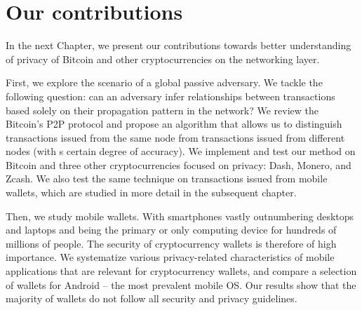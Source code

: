 \section{Our contributions}
\label{sec:C02S4OurContributions}

In the next Chapter, we present our contributions towards better understanding of privacy of Bitcoin and other cryptocurrencies on the networking layer.

First, we explore the scenario of a global passive adversary.
We tackle the following question: can an adversary infer relationships between transactions based solely on their propagation pattern in the network?
We review the Bitcoin's P2P protocol and propose an algorithm that allows us to distinguish transactions issued from the same node from transactions issued from different nodes (with s certain degree of accuracy).
We implement and test our method on Bitcoin and three other cryptocurrencies focused on privacy: Dash, Monero, and Zcash.
We also test the same technique on transactions issued from mobile wallets, which are studied in more detail in the subsequent chapter.

Then, we study mobile wallets.
With smartphones vastly outnumbering desktops and laptops and being the primary or only computing device for hundreds of millions of people.
The security of cryptocurrency wallets is therefore of high importance.
We systematize various privacy-related characteristics of mobile applications that are relevant for cryptocurrency wallets, and compare a selection of  wallets for Android -- the most prevalent mobile OS.
Our results show that the majority of wallets do not follow all security and privacy guidelines.

